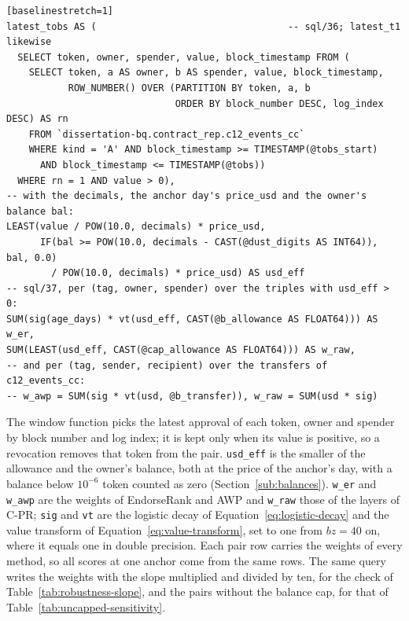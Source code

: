 \begin{verbatim}[baselinestretch=1]
latest_tobs AS (                                  -- sql/36; latest_t1 likewise
  SELECT token, owner, spender, value, block_timestamp FROM (
    SELECT token, a AS owner, b AS spender, value, block_timestamp,
           ROW_NUMBER() OVER (PARTITION BY token, a, b
                              ORDER BY block_number DESC, log_index DESC) AS rn
    FROM `dissertation-bq.contract_rep.c12_events_cc`
    WHERE kind = 'A' AND block_timestamp >= TIMESTAMP(@tobs_start)
      AND block_timestamp <= TIMESTAMP(@tobs))
  WHERE rn = 1 AND value > 0),
-- with the decimals, the anchor day's price_usd and the owner's balance bal:
LEAST(value / POW(10.0, decimals) * price_usd,
      IF(bal >= POW(10.0, decimals - CAST(@dust_digits AS INT64)), bal, 0.0)
        / POW(10.0, decimals) * price_usd) AS usd_eff
-- sql/37, per (tag, owner, spender) over the triples with usd_eff > 0:
SUM(sig(age_days) * vt(usd_eff, CAST(@b_allowance AS FLOAT64))) AS w_er,
SUM(LEAST(usd_eff, CAST(@cap_allowance AS FLOAT64))) AS w_raw,
-- and per (tag, sender, recipient) over the transfers of c12_events_cc:
-- w_awp = SUM(sig * vt(usd, @b_transfer)), w_raw = SUM(usd * sig)
\end{verbatim}

The window function picks the latest approval of each token, owner and spender by block number and log index; it is kept only when its value is positive, so a revocation removes that token from the pair. \texttt{usd\_eff} is the smaller of the allowance and the owner's balance, both at the price of the anchor's day, with a balance below $10^{-6}$ token counted as zero (Section~\ref{sub:balances}). \texttt{w\_er} and \texttt{w\_awp} are the weights of EndorseRank and AWP and \texttt{w\_raw} those of the layers of \mbox{C-PR}; \texttt{sig} and \texttt{vt} are the logistic decay of Equation~\eqref{eq:logistic-decay} and the value transform of Equation~\eqref{eq:value-transform}, set to one from $bz=40$ on, where it equals one in double precision. Each pair row carries the weights of every method, so all scores at one anchor come from the same rows. The same query writes the weights with the slope multiplied and divided by ten, for the check of Table~\ref{tab:robustness-slope}, and the pairs without the balance cap, for that of Table~\ref{tab:uncapped-sensitivity}.
